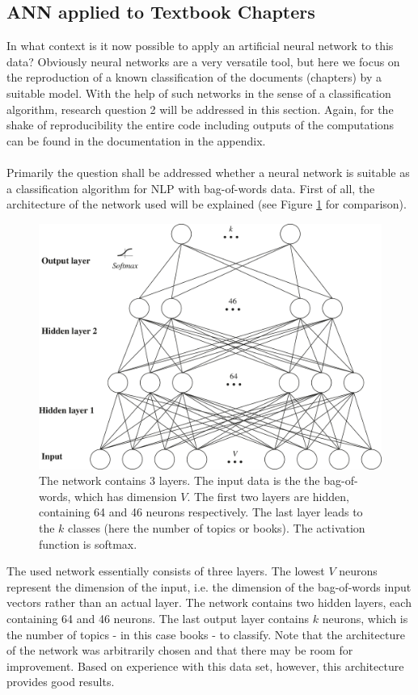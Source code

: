 \documentclass[11pt,a4paper]{article}
\begin{document}
\subsection{ANN applied to Textbook Chapters} \label{sec:ANN.example}

In what context is it now possible to apply an artificial neural network to this data? Obviously neural networks are a very versatile tool, but here we focus on the reproduction of a known classification of the documents (chapters) by a suitable model. With the help of such networks in the sense of a classification algorithm, research question 2 will be addressed in this section. Again, for the shake of reproducibility the entire code including outputs of the computations can be found in the documentation in the appendix.\\
\ \\
Primarily the question shall be addressed whether a neural network is suitable as a classification algorithm for NLP with bag-of-words data. First of all, the architecture of the network used will be explained (see Figure \ref{fig:network_structure} for comparison).
\begin{figure}[h]
	\centering\includegraphics[width=1\textwidth]{network_structure.pdf}
	\caption{The network contains 3 layers. The input data is the the bag-of-words, which has dimension $V$. The first two layers are hidden, containing 64 and 46 neurons respectively. The last layer leads to the $k$ classes (here the number of topics or books). The activation function is softmax.}
	\label{fig:network_structure}
\end{figure}
The used network essentially consists of three layers. The lowest $V$ neurons represent the dimension of the input, i.e. the dimension of the bag-of-words input vectors rather than an actual layer. The network contains two hidden layers, each containing 64 and 46 neurons. The last output layer contains $k$ neurons, which is the number of topics - in this case books - to classify. Note that the architecture of the network was arbitrarily chosen and that there may be room for improvement. Based on experience with this data set, however, this architecture provides good results.\\
\end{document}
